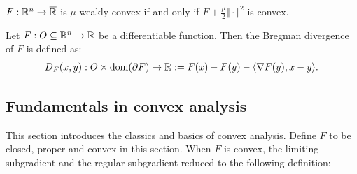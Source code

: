 \documentclass[12pt]{article}
\begin{document}
        \begin{definition}
            $F: \mathbb R^n \rightarrow \overline {\mathbb R}$ is $\mu$ weakly convex if and only if $F + \frac{\mu}{2}\Vert \cdot\Vert^2$ is convex. 
        \end{definition}
        \begin{definition}
            Let $F: O \subseteq \mathbb R^n \rightarrow \mathbb R$ be a differentiable function. 
            Then the Bregman divergence of $F$ is defined as: 
            \begin{align*}
                D_F(x, y): O \times \operatorname{dom}(\partial F) \rightarrow \mathbb R
                := F(x) - F(y) - \langle \nabla F(y), x - y\rangle. 
            \end{align*}
        \end{definition}
    \subsection{Fundamentals in convex analysis}
        This section introduces the classics and basics of convex analysis. 
        Define $F$ to be closed, proper and convex in this section. 
        When $F$ is convex, the limiting subgradient and the regular subgradient reduced to the following definition:
\end{document}
